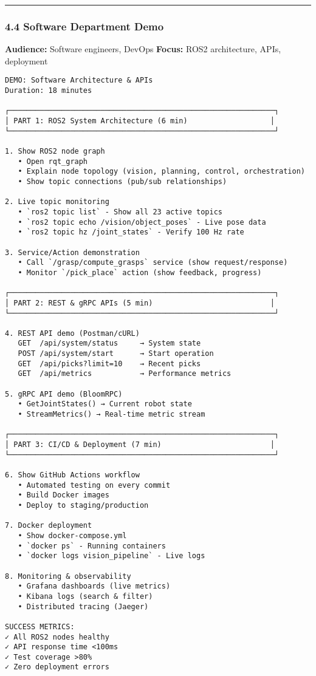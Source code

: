 \documentclass[
]{article}
\begin{document}
\begin{center}\rule{0.5\linewidth}{0.5pt}\end{center}

\hypertarget{software-department-demo}{%
\subsubsection{4.4 Software Department
Demo}\label{software-department-demo}}

\textbf{Audience:} Software engineers, DevOps \textbf{Focus:} ROS2
architecture, APIs, deployment

\begin{verbatim}
DEMO: Software Architecture & APIs
Duration: 18 minutes

┌─────────────────────────────────────────────────────────────┐
│ PART 1: ROS2 System Architecture (6 min)                   │
└─────────────────────────────────────────────────────────────┘

1. Show ROS2 node graph
   • Open rqt_graph
   • Explain node topology (vision, planning, control, orchestration)
   • Show topic connections (pub/sub relationships)

2. Live topic monitoring
   • `ros2 topic list` - Show all 23 active topics
   • `ros2 topic echo /vision/object_poses` - Live pose data
   • `ros2 topic hz /joint_states` - Verify 100 Hz rate

3. Service/Action demonstration
   • Call `/grasp/compute_grasps` service (show request/response)
   • Monitor `/pick_place` action (show feedback, progress)

┌─────────────────────────────────────────────────────────────┐
│ PART 2: REST & gRPC APIs (5 min)                           │
└─────────────────────────────────────────────────────────────┘

4. REST API demo (Postman/cURL)
   GET  /api/system/status     → System state
   POST /api/system/start      → Start operation
   GET  /api/picks?limit=10    → Recent picks
   GET  /api/metrics           → Performance metrics

5. gRPC API demo (BloomRPC)
   • GetJointStates() → Current robot state
   • StreamMetrics() → Real-time metric stream

┌─────────────────────────────────────────────────────────────┐
│ PART 3: CI/CD & Deployment (7 min)                         │
└─────────────────────────────────────────────────────────────┘

6. Show GitHub Actions workflow
   • Automated testing on every commit
   • Build Docker images
   • Deploy to staging/production

7. Docker deployment
   • Show docker-compose.yml
   • `docker ps` - Running containers
   • `docker logs vision_pipeline` - Live logs

8. Monitoring & observability
   • Grafana dashboards (live metrics)
   • Kibana logs (search & filter)
   • Distributed tracing (Jaeger)

SUCCESS METRICS:
✓ All ROS2 nodes healthy
✓ API response time <100ms
✓ Test coverage >80%
✓ Zero deployment errors
\end{verbatim}
\end{document}
